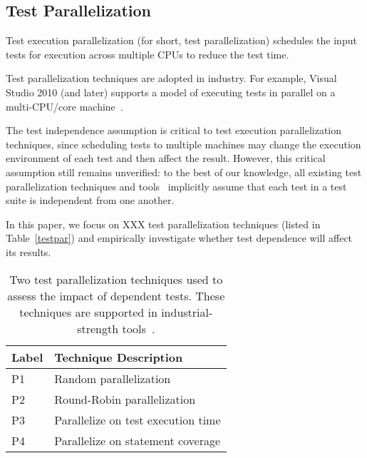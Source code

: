 \subsection{Test Parallelization}

Test execution parallelization (for short, test parallelization)
schedules the input tests for execution across
multiple CPUs to reduce the test time.

Test parallelization techniques are adopted in
industry. For example, Visual Studio 2010 (and later)
supports a model of executing tests in parallel on a multi-CPU/core machine~\cite{}.

The test independence assumption is critical to test
execution parallelization techniques, since scheduling tests
to multiple machines may change the execution environment
of each test and then affect the result. However, this critical
assumption still remains unverified: to the best of our
knowledge, all existing test parallelization techniques and
tools~\cite{} implicitly assume that each test in a test
suite is independent from one another.

In this paper, we focus on XXX test parallelization techniques
(listed in Table~\ref{testpar}) and empirically investigate whether test dependence will affect its
results.

\begin{table}
\centering
\setlength{\tabcolsep}{0.25\tabcolsep}
\begin{tabular}{|l|l|}
\hline
\textbf{Label} & \textbf{Technique Description} \\
\hline
P1 & Random parallelization\\
P2 & Round-Robin parallelization\\
P3 & Parallelize on test execution time\\
P4 & Parallelize on statement coverage\\
\hline
\end{tabular}
\caption{Two test parallelization techniques used
to assess the impact of dependent tests. These
techniques are supported in industrial-strength
tools~\cite{}. 
}
\label{tab:testpar}
\end{table}
